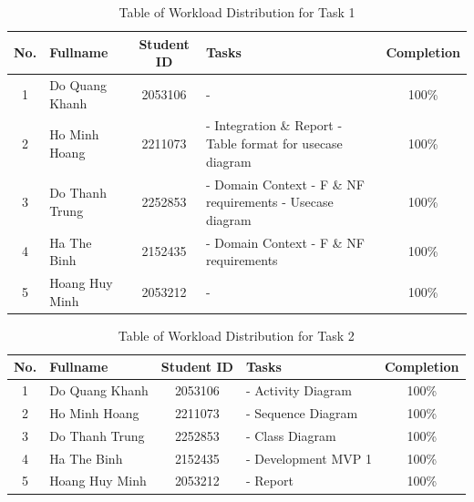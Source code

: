 \documentclass[a4paper]{report}
\begin{document}

\newpage
\tableofcontents
\newpage


\vspace{5cm}

\begin{table}[H]
\renewcommand{\arraystretch}{1.8}
\centering
\begin{tabular}{|c|p{3cm}|c|p{6cm}|c|}
\hline
\textbf{No.} & \textbf{Fullname} & \textbf{Student ID} & \textbf{Tasks} & \textbf{Completion} \\
\hline
1 & Do Quang Khanh   & 2053106   & -                     & 100\% \\
\hline
2 & Ho Minh Hoang    & 2211073   & - Integration \& Report \newline
- Table format for usecase diagram& 100\% \\
\hline
3 & Do Thanh Trung   & 2252853   & - Domain Context \newline - F \& NF requirements \newline - Usecase diagram     & 100\% \\
\hline
4 & Ha The Binh      & 2152435   & - Domain Context \newline - F \& NF requirements & 100\% \\
\hline
5 & Hoang Huy Minh   & 2053212   & -               & 100\% \\
\hline
\end{tabular}
\caption{Table of Workload Distribution for Task 1}
\end{table}

\begin{table}[H]
\renewcommand{\arraystretch}{1.8}
\centering
\begin{tabular}{|c|p{3cm}|c|p{6cm}|c|}
\hline
\textbf{No.} & \textbf{Fullname} & \textbf{Student ID} & \textbf{Tasks} & \textbf{Completion} \\
\hline
1 & Do Quang Khanh & 2053106 & - Activity Diagram & 100\% \\
\hline
2 & Ho Minh Hoang & 2211073 & - Sequence Diagram & 100\% \\
\hline
3 & Do Thanh Trung & 2252853 & - Class Diagram & 100\% \\
\hline
4 & Ha The Binh      & 2152435   & - Development MVP 1 & 100\% \\
\hline
5 & Hoang Huy Minh   & 2053212   & - Report               & 100\% \\
\hline
\end{tabular}
\caption{Table of Workload Distribution for Task 2}
\end{table}
\end{document}
